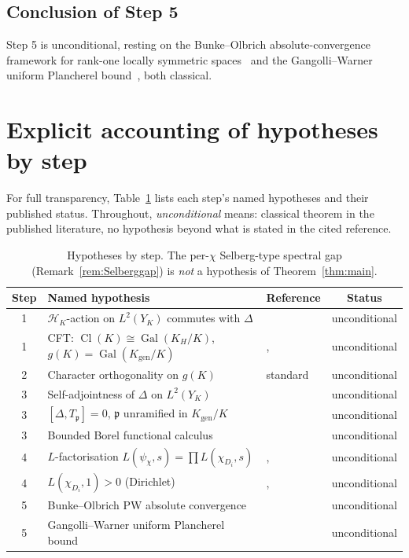 \documentclass[11pt,a4paper,reqno]{amsart}
\theoremstyle{definition}
\DeclareMathOperator{\Cl}{Cl}
\DeclareMathOperator{\Gal}{Gal}
\newcommand{\fp}{\mathfrak{p}}
\newcommand{\YK}{Y_K}
\newcommand{\gK}{g(K)}
\newcommand{\Kgen}{K_{\mathrm{gen}}}
\newcommand{\KH}{K_H}
\newcommand{\Heis}{\mathcal{H}}
\begin{document}
\subsection*{Conclusion of Step 5}
Step 5 is unconditional, resting on the Bunke--Olbrich absolute-convergence framework for rank-one locally symmetric spaces~\cite{BunkeOlbrich1995} and the Gangolli--Warner uniform Plancherel bound~\cite{GangolliWarner1980}, both classical.

\section{Explicit accounting of hypotheses by step}\label{sec:hypos}

For full transparency, Table~\ref{tab:hypotheses} lists each step's named hypotheses and their published status. Throughout, \emph{unconditional} means: classical theorem in the published literature, no hypothesis beyond what is stated in the cited reference.

\begin{table}[h]
\centering
\renewcommand{\arraystretch}{1.15}
\begin{tabular}{c l l c}
\toprule
Step & Named hypothesis & Reference & Status \\
\midrule
1 & $\Heis_K$-action on $L^2(\YK)$ commutes with $\Delta$ & \cite[\S7.6]{ElstrodtGrunewaldMennicke1998} & unconditional \\
1 & CFT: $\Cl(K)\cong\Gal(\KH/K)$, $\gK=\Gal(\Kgen/K)$ & \cite[\S VI.6]{Neukirch1999}, \cite{Cox1989} & unconditional \\
2 & Character orthogonality on $\gK$ & standard & unconditional \\
3 & Self-adjointness of $\Delta$ on $L^2(\YK)$ & \cite[\S4]{ElstrodtGrunewaldMennicke1998} & unconditional \\
3 & $[\Delta,T_\fp]=0$, $\fp$ unramified in $\Kgen/K$ & \cite[\S7.6.6]{ElstrodtGrunewaldMennicke1998} & unconditional \\
3 & Bounded Borel functional calculus & \cite[\S13.24]{RudinFA} & unconditional \\
4 & $L$-factorisation $L(\psi_\chi,s)=\prod L(\chi_{D_i},s)$ & \cite[\S7.B]{Cox1989}, \cite[\S253]{Gauss1801} & unconditional \\
4 & $L(\chi_{D_i},1)>0$ (Dirichlet) & \cite{Dirichlet1839}, \cite[\S6]{Davenport2000} & unconditional \\
5 & Bunke--Olbrich PW absolute convergence & \cite{BunkeOlbrich1995} & unconditional \\
5 & Gangolli--Warner uniform Plancherel bound & \cite{GangolliWarner1980} & unconditional \\
\bottomrule
\end{tabular}
\caption{Hypotheses by step. The per-$\chi$ Selberg-type spectral gap (Remark~\ref{rem:Selberggap}) is \emph{not} a hypothesis of Theorem~\ref{thm:main}.}\label{tab:hypotheses}
\end{table}
\end{document}
